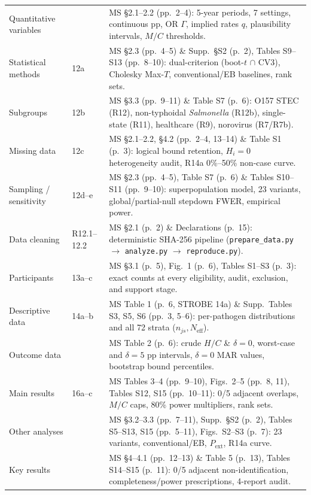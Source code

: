 \documentclass[11pt,a4paper]{article}
\begin{document}
\begin{table}[!htbp]
\begin{tabular}{>{\raggedright\arraybackslash}p{2.3cm} >{\raggedright\arraybackslash}p{1.5cm} >{\raggedright\arraybackslash}p{10.2cm}}
Quantitative variables & 11 & MS §2.1--2.2 (pp.\ 2--4): 5-year periods, 7 settings, continuous pp, OR $\Gamma$, implied rates $q$, plausibility intervals, $M/C$ thresholds. \\
Statistical methods & 12a & MS §2.3 (pp.\ 4--5) \& Supp.\ §S2 (p.\ 2), Tables S9--S13 (pp.\ 8--10): dual-criterion (boot-$t$ $\cap$ CV3), Cholesky Max-$T$, conventional/EB baselines, rank sets. \\
Subgroups & 12b & MS §3.3 (pp.\ 9--11) \& Table S7 (p.\ 6): O157 STEC (R12), non-typhoidal \textit{Salmonella} (R12b), single-state (R11), healthcare (R9), norovirus (R7/R7b). \\
Missing data & 12c & MS §2.1--2.2, §4.2 (pp.\ 2--4, 13--14) \& Table S1 (p.\ 3): logical bound retention, $H_i=0$ heterogeneity audit, R14a 0\%--50\% non-case curve. \\
Sampling / sensitivity & 12d--e & MS §2.3 (pp.\ 4--5), Table S7 (p.\ 6) \& Tables S10--S11 (pp.\ 9--10): superpopulation model, 23 variants, global/partial-null stepdown FWER, empirical power. \\
Data cleaning & R12.1--12.2 & MS §2.1 (p.\ 2) \& Declarations (p.\ 15): deterministic SHA-256 pipeline (\texttt{prepare\_data.py} $\rightarrow$ \texttt{analyze.py} $\rightarrow$ \texttt{reproduce.py}). \\
Participants & 13a--c & MS §3.1 (p.\ 5), Fig.\ 1 (p.\ 6), Tables S1--S3 (p.\ 3): exact counts at every eligibility, audit, exclusion, and support stage. \\
Descriptive data & 14a--b & MS Table 1 (p.\ 6, STROBE 14a) \& Supp.\ Tables S3, S5, S6 (pp.\ 3, 5--6): per-pathogen distributions and all 72 strata ($n_{js}, N_{\text{eff}}$). \\
Outcome data & 15 & MS Table 2 (p.\ 6): crude $H/C$ \& $\delta = 0$, worst-case and $\delta = 5\text{ pp}$ intervals, $\delta = 0$ MAR values, bootstrap bound percentiles. \\
Main results & 16a--c & MS Tables 3--4 (pp.\ 9--10), Figs.\ 2--5 (pp.\ 8, 11), Tables S12, S15 (pp.\ 10--11): 0/5 adjacent overlaps, $M/C$ caps, 80\% power multipliers, rank sets. \\
Other analyses & 17 & MS §3.2--3.3 (pp.\ 7--11), Supp.\ §S2 (p.\ 2), Tables S5--S13, S15 (pp.\ 5--11), Figs.\ S2--S3 (p.\ 7): 23 variants, conventional/EB, $P_{\mathrm{ext}}$, R14a curve. \\
Key results & 18 & MS §4--4.1 (pp.\ 12--13) \& Table 5 (p.\ 13), Tables S14--S15 (p.\ 11): 0/5 adjacent non-identification, completeness/power prescriptions, 4-report audit. \\

\end{tabular}
\end{table}
\end{document}
